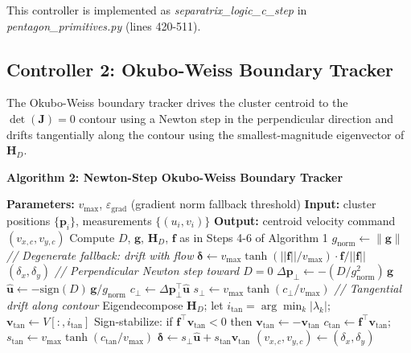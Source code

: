 \documentclass[lettersize,journal]{IEEEtran}
\begin{document}
\vspace{4pt}

This controller is implemented as \textit{separatrix\_logic\_c\_step} in
\textit{pentagon\_primitives.py} (lines 420-511).

\subsection{Controller 2: Okubo-Weiss Boundary Tracker}
\label{sec:ow_controller}

The Okubo-Weiss boundary tracker drives the cluster centroid to the
$\det(\mathbf{J}) = 0$ contour using a Newton step in the perpendicular
direction and drifts tangentially along the contour using the smallest-magnitude
eigenvector of $\mathbf{H}_D$.

\vspace{4pt}
\noindent\textbf{Algorithm 2: Newton-Step Okubo-Weiss Boundary Tracker}
\begin{algorithmic}[1]
    \STATE \textbf{Parameters:} $v_{\max}$, $\varepsilon_{\text{grad}}$
           (gradient norm fallback threshold)
    \STATE \textbf{Input:} cluster positions $\{\mathbf{p}_i\}$,
           measurements $\{(u_i, v_i)\}$
    \STATE \textbf{Output:} centroid velocity command $(v_{x,c}, v_{y,c})$
    \STATE Compute $D$, $\mathbf{g}$, $\mathbf{H}_D$, $\mathbf{f}$ as in
           Steps 4-6 of Algorithm 1
    \STATE $g_{\text{norm}} \leftarrow \|\mathbf{g}\|$
        \STATE \textit{// Degenerate fallback: drift with flow}
        \STATE $\boldsymbol{\delta} \leftarrow
               v_{\max}\tanh(||\mathbf{f}|| / v_{\max}) \cdot
               \mathbf{f} / ||\mathbf{f}||$
        \RETURN $(\delta_x, \delta_y)$
    \ENDIF
    \STATE \textit{// Perpendicular Newton step toward $D = 0$}
    \STATE $\Delta \mathbf{p}_{\perp} \leftarrow
           -(D / g_{\text{norm}}^2)\,\mathbf{g}$
    \STATE $\hat{\mathbf{u}} \leftarrow -\text{sign}(D)\,\mathbf{g} /
           g_{\text{norm}}$
    \STATE $c_{\perp} \leftarrow \Delta\mathbf{p}_{\perp}^\top \hat{\mathbf{u}}$
    \STATE $s_{\perp} \leftarrow v_{\max}\tanh(c_{\perp} / v_{\max})$
    \STATE \textit{// Tangential drift along contour}
    \STATE Eigendecompose $\mathbf{H}_D$; let $i_{\tan} =
           \arg\min_k |\lambda_k|$; $\mathbf{v}_{\tan} \leftarrow
           V[:, i_{\tan}]$
    \STATE Sign-stabilize: if $\mathbf{f}^\top \mathbf{v}_{\tan} < 0$ then
           $\mathbf{v}_{\tan} \leftarrow -\mathbf{v}_{\tan}$
    \STATE $c_{\tan} \leftarrow \mathbf{f}^\top \mathbf{v}_{\tan}$; \;
           $s_{\tan} \leftarrow v_{\max}\tanh(c_{\tan} / v_{\max})$
    \STATE $\boldsymbol{\delta} \leftarrow s_{\perp}\hat{\mathbf{u}} +
           s_{\tan}\mathbf{v}_{\tan}$
    \RETURN $(v_{x,c}, v_{y,c}) \leftarrow (\delta_x, \delta_y)$
\end{algorithmic}
\end{document}
